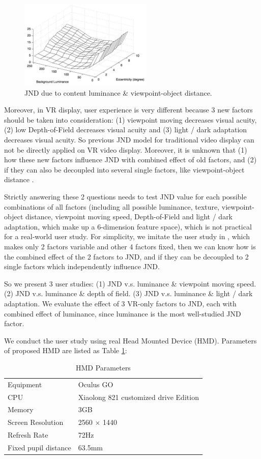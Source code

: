 \begin{figure}
  \centering
  \includegraphics[width=2.5in]{images/JNDlum-dist.jpg}
  \caption{JND due to content luminance \& viewpoint-object distance.}
  \label{JNDlum-dist}
  \end{figure}

Moreover, in VR display, user experience is very different because 3 new factors should be taken into consideration: (1) viewpoint moving decreases visual acuity, (2) low Depth-of-Field decreases visual acuity and (3) light / dark adaptation decreases visual acuity. So previous JND model for traditional video display can not be directly applied on VR video display. Moreover, it is unknown that (1) how these new factors influence JND with combined effect of old factors, and (2) if they can also be decoupled into several single factors, like viewpoint-object distance \cite{distance}.

Strictly answering these 2 questions needs to test JND value for each possible combinations of all factors (including all possible luminance, texture, viewpoint-object distance, viewpoint moving speed, Depth-of-Field and light / dark adaptation, which make up a 6-dimension feature space), which is not practical for a real-world user study. For simplicity, we imitate the user study in \cite{distance}, which makes only 2 factors variable and other 4 factors fixed, then we can know how is the combined effect of the 2 factors to JND, and if they can be decoupled to 2 single factors which independently influence JND.

So we present 3 user studies: (1) JND v.s. luminance \& viewpoint moving speed. (2) JND v.s. luminance \& depth of field. (3) JND v.s. luminance \& light / dark adaptation. We evaluate the effect of 3 VR-only factors to JND, each with combined effect of luminance, since luminance is the most well-studied JND factor.

We conduct the user study using real Head Mounted Device (HMD). Parameters of proposed HMD are listed as Table \ref{table1}:

\begin{table}[h]
\centering
\caption{HMD Parameters}\label{table1}
\begin{tabular}{|p{3.5cm}|p{3.5cm}|}
\hline
Equipment & Oculus GO\\
CPU & Xiaolong 821 customized drive Edition\\
Memory & 3GB\\
Screen Resolution & 2560 $\times$ 1440\\
Refresh Rate & 72Hz\\
Fixed pupil distance & 63.5mm\\
\hline
\end{tabular}
\end{table}

